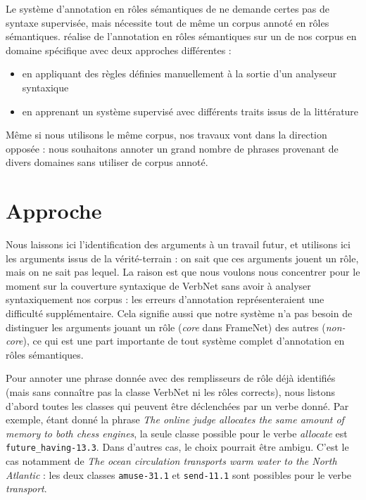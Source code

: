 Le système d'annotation en rôles sémantiques de \cite{gormley2014low} ne
demande certes pas de syntaxe supervisée, mais nécessite tout de même un corpus
annoté en rôles sémantiques. \cite{hadouche2011annotation} réalise de
l'annotation en rôles sémantiques sur un de nos corpus en domaine spécifique
avec deux approches différentes :

\begin{itemize}

    \item en appliquant des règles définies manuellement à la sortie d'un
        analyseur syntaxique

    \item en apprenant un système supervisé avec différents traits issus de la
        littérature

\end{itemize}

Même si nous utilisons le même corpus, nos travaux vont dans la direction
opposée : nous souhaitons annoter un grand nombre de phrases provenant de
divers domaines sans utiliser de corpus annoté.

\section{Approche}
\label{sec:domainsrl_approche}


Nous laissons ici l'identification des arguments à un travail futur, et
utilisons ici les arguments issus de la vérité-terrain : on sait que ces
arguments jouent un rôle, mais on ne sait pas lequel. La raison est que nous
voulons nous concentrer pour le moment sur la couverture syntaxique de VerbNet
sans avoir à analyser syntaxiquement nos corpus : les erreurs d'annotation
représenteraient une difficulté supplémentaire. Cela signifie aussi que notre
système n'a pas besoin de distinguer les arguments jouant un rôle (\emph{core}
dans FrameNet) des autres (\emph{non-core}), ce qui est une part importante de
tout système complet d'annotation en rôles sémantiques.

Pour annoter une phrase donnée avec des remplisseurs de rôle déjà identifiés
(mais sans connaître pas la classe VerbNet ni les rôles corrects), nous listons
d'abord toutes les classes qui peuvent être déclenchées par un verbe donné. Par
exemple, étant donné la phrase \emph{The online judge allocates the same amount
of memory to both chess engines}, la seule classe possible pour le verbe
\emph{allocate} est \texttt{future\_having-13.3}. Dans d'autres cas, le choix
pourrait être ambigu. C'est le cas notamment de \emph{The ocean circulation
transports warm water to the North Atlantic} : les deux classes
\texttt{amuse-31.1} et \texttt{send-11.1} sont possibles pour le verbe
\emph{transport}.

